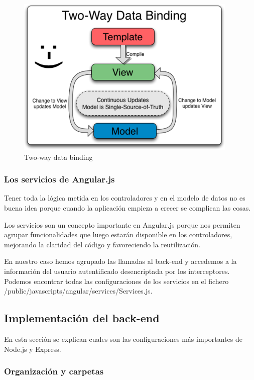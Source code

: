 \begin{figure}[H]
	\centering\includegraphics[scale=0.5]{imagenes/twoway.png}
	\caption{Two-way data binding}
	\label{twoWayDataBinding}
\end{figure}

\subsubsection{Los servicios de Angular.js}

Tener toda la lógica metida en los controladores y en el modelo de datos no es buena idea porque cuando la aplicación empieza a crecer se complican las cosas.

Los servicios son un concepto importante en Angular.js porque nos permiten agrupar funcionalidades que luego estarán disponible en los controladores, mejorando la claridad del código y favoreciendo la reutilización.

En nuestro caso hemos agrupado las llamadas al back-end y accedemos a la información del usuario autentificado desencriptada por los interceptores. Podemos encontrar todas las configuraciones de los servicios en el fichero /public/javascripts/angular/services/Services.js.

\subsection{Implementación del back-end}

En esta sección se explican cuales son las configuraciones más importantes de Node.js y Express. 

\subsubsection{Organización y carpetas}

